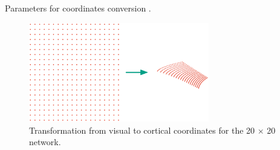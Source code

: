 \begin{table}[!htp]
    \centering
    
    \caption[Coordinates conversion parameters]{Parameters for coordinates conversion \cite{Polimeni2005}.}
    \label{tab:cortical-coords-params}
\end{table}

\begin{figure}[!htp]
    \centering
    \includegraphics[width=0.7\textwidth]{src/assets/images/coords.pdf}
    \caption[Coordinates tranformation]{Transformation from visual to cortical coordinates for the 20 $\times$ 20 network.}
    \label{fig:coords-transformation}
\end{figure}
